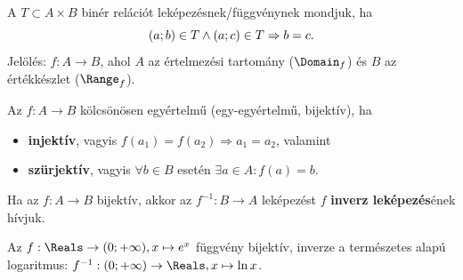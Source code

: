 \begin{definition}[Függvény]
  A $T \subset A \times B$ binér relációt leképezésnek/függvénynek mondjuk, ha
  \[
    (a; b) \in T \land (a; c)\in T \Rightarrow b = c
    \text.
  \]
  Jelölés: $f: A \rightarrow B$, ahol $A$ az értelmezési tartomány ($\Domain_f$)
  és $B$ az értékkészlet ($\Range_f$).
\end{definition}


\begin{definition}[Bijekció]
  Az $f : A \rightarrow B$ kölcsönösen egyértelmű (egy-egyértelmű, bijektív), ha
  \begin{itemize}
    \item \textbf{injektív}, vagyis $f(a_1) = f(a_2) \Rightarrow a_1 = a_2$,
          valamint
    \item \textbf{szürjektív}, vagyis $\forall b \in B$ esetén $\exists a \in A:
            f(a) = b$.
  \end{itemize}
\end{definition}

\begin{note}
  Ha az $f: A \rightarrow B$ bijektív, akkor az $f^{-1}: B \rightarrow A$
  leképezést $f$ \textbf{inverz leképezés}ének hívjuk.
\end{note}

\begin{example}
  Az $f: \Reals \rightarrow (0; +\infty), x \mapsto e^x$ függvény bijektív,
  inverze a természetes alapú logaritmus: $f^{-1}: (0; +\infty) \rightarrow
    \Reals, x \mapsto \ln x$.

  \begin{center}
  \end{center}
\end{example}

\clearpage